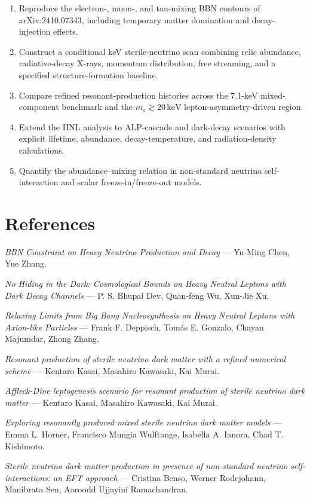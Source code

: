 \documentclass[11pt,a4paper]{article}
\begin{document}
\begin{enumerate}
\item Reproduce the electron-, muon-, and tau-mixing BBN contours of arXiv:2410.07343, including temporary matter domination and decay-injection effects.
\item Construct a conditional keV sterile-neutrino scan combining relic abundance, radiative-decay X-rays, momentum distribution, free streaming, and a specified structure-formation baseline.
\item Compare refined resonant-production histories across the 7.1-keV mixed-component benchmark and the \(m_s\gtrsim20\,\mathrm{keV}\) lepton-asymmetry-driven region.
\item Extend the HNL analysis to ALP-cascade and dark-decay scenarios with explicit lifetime, abundance, decay-temperature, and radiation-density calculations.
\item Quantify the abundance--mixing relation in non-standard neutrino self-interaction and scalar freeze-in/freeze-out models.
\end{enumerate}

\section*{References}

\textit{BBN Constraint on Heavy Neutrino Production and Decay} --- Yu-Ming Chen, Yue Zhang.

\textit{No Hiding in the Dark: Cosmological Bounds on Heavy Neutral Leptons with Dark Decay Channels} --- P. S. Bhupal Dev, Quan-feng Wu, Xun-Jie Xu.

\textit{Relaxing Limits from Big Bang Nucleosynthesis on Heavy Neutral Leptons with Axion-like Particles} --- Frank F. Deppisch, Tomás E. Gonzalo, Chayan Majumdar, Zhong Zhang.

\textit{Resonant production of sterile neutrino dark matter with a refined numerical scheme} --- Kentaro Kasai, Masahiro Kawasaki, Kai Murai.

\textit{Affleck-Dine leptogenesis scenario for resonant production of sterile neutrino dark matter} --- Kentaro Kasai, Masahiro Kawasaki, Kai Murai.

\textit{Exploring resonantly produced mixed sterile neutrino dark matter models} --- Emma L. Horner, Francisco Mungia Wulftange, Isabella A. Ianora, Chad T. Kishimoto.

\textit{Sterile neutrino dark matter production in presence of non-standard neutrino self-interactions: an EFT approach} --- Cristina Benso, Werner Rodejohann, Manibrata Sen, Aaroodd Ujjayini Ramachandran.
\end{document}
